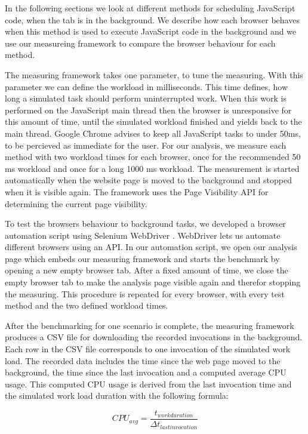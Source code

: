 \documentclass[article,type=bsc,colorback,accentcolor=tud9c]{tudthesis}
\begin{document}
  In the following sections we look at different methods for scheduling JavaScript code, when the tab is in the background. We describe how each browser behaves when this method is used to execute JavaScript code in the background and we use our measureing framework to compare the browser behaviour for each method.

  The measuring framework takes one parameter, to tune the measuring. With this parameter we can define the workload in milliseconds. This time defines, how long a simulated task should perform uninterrupted work. When this work is performed on the JavaScript main thread then the browser is unresponsive for this amount of time, until the simulated workload finished and yields back to the main thread. Google Chrome advises to keep all JavaScript tasks to under 50ms, to be percieved as immediate for the user\cite{chrome-rail-model}. For our analysis, we measure each method with two workload times for each browser, once for the recommended 50 ms workload and once for a long 1000 ms workload. The measurement is started automatically when the website page is moved to the background and stopped when it is visible again. The framework uses the Page Visibility API \cite{mdn-page-visibility} for determining the current page visibility.

  To test the browsers behaviour to background tasks, we developed a browser automation script using Selenium WebDriver \cite{webdriver}. WebDriver lets us automate different browsers using an API. In our automation script, we open our analysis page which embeds our measuring framework and starts the benchmark by opening a new empty browser tab. After a fixed amount of time, we close the empty browser tab to make the analysis page visible again and therefor stopping the measuring. This procedure is repeated for every browser, with every test method and the two defined workload times.

  After the benchmarking for one scenario is complete, the measuring framework produces a CSV file for downloading the recorded invocations in the background. Each row in the CSV file corresponds to one invocation of the simulated work load. The recorded data includes the time since the web page moved to the background, the time since the last invocation and a computed average CPU usage. This computed CPU usage is derived from the last invocation time and the simulated work load duration with the following formula:

  \begin{equation*}
    CPU_{avg} = \frac{t_{work duration}}{\Delta t_{last invocation}}
  \end{equation*}
\end{document}
